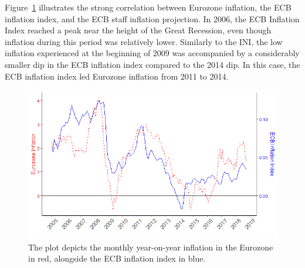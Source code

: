 \documentclass[review]{elsarticle}
\begin{document}
Figure~\ref{ECB_inf} illustrates the strong correlation between Eurozone inflation, the ECB inflation index, and the ECB staff inflation projection. In 2006, the ECB Inflation Index reached a peak near the height of the Great Recession, even though inflation during this period was relatively lower. Similarly to the INI, the low inflation experienced at the beginning of 2009 was accompanied by a considerably smaller dip in the ECB inflation index compared to the 2014 dip. In this case, the ECB inflation index led Eurozone inflation from 2011 to 2014.

   \begin{figure}[!ht]
    \centering
    \includegraphics{ECB_inf_inf.png}
  \caption{The plot depicts the monthly year-on-year inflation in the Eurozone in red, alongside the ECB inflation index in blue.}
    \label{ECB_inf}
    \end{figure}
\end{document}
